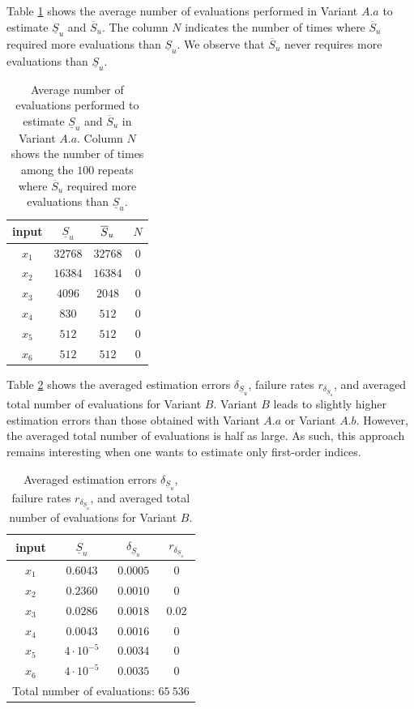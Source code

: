 Table \ref{comparison.gfunc} shows the average number of evaluations performed in Variant $A.a$ to estimate $\underline{S}_u$ and $\overline{S}_u$. The column $N$ indicates the number of times where $\overline{S}_u$ required more evaluations than $\underline{S}_u$. We observe that $\overline{S}_u$ never requires more evaluations than $\underline{S}_u$.
\begin{table}[t]
\caption{Average number of evaluations performed to estimate $\underline{S}_u$ and $\overline{S}_u$ in Variant $A.a$. Column $N$ shows the number of times among the $100$ repeats where $\overline{S}_u$ required more evaluations than $\underline{S}_u$.}
\centering
\begin{tabular}{cccc}
\hline
 input & $\underline{S}_u$ & $\ov{$S$}_u$ & $N$ \\ \hline
 $x_1$ & $32768$ & $32768$ & $0$ \\   \hline
 $x_2$ & $16384$ & $16384$ & $0$ \\  \hline
 $x_3$ & $4096$ & $2048$ & $0$ \\  \hline
 $x_4$ & $830$ & $512$ & $0$ \\  \hline
 $x_5$ & $512$ & $512$ & $0$ \\  \hline
 $x_6$ & $512$ & $512$ & $0$ \\  \hline
\end{tabular}
\label{comparison.gfunc}
\end{table}
\bigskip

Table \ref{res.gfunc.B} shows the averaged estimation errors $\delta_{\underline{S}_u}$, failure rates $r_{\delta_{\underline{S}_u}}$, and averaged total number of evaluations for Variant $B$. Variant $B$ leads to slightly higher estimation errors than those obtained with Variant $A.a$ or Variant $A.b$. However, the averaged total number of evaluations is half as large. As such, this approach remains interesting when one wants to estimate only first-order indices.
\begin{table}[t]
\caption{Averaged estimation errors $\delta_{\underline{S}_u}$, failure rates $r_{\delta_{\underline{S}_u}}$, and averaged total number of evaluations for Variant $B$.}
\centering
\begin{tabular}{cccc}
\hline
 input & $\underline{S}_u$ & $\delta_{\underline{S}_u}$ & $r_{\delta_{\underline{S}_u}}$ \\ \hline
 $x_1$ & $0.6043$ &  $0.0005$ & $0$ \\ \hline
 $x_2$ & $0.2360$ &  $0.0010$ & $0$ \\ \hline
 $x_3$ & $0.0286$ &  $0.0018$ & $0.02$ \\ \hline
 $x_4$ & $0.0043$ &  $0.0016$ & $0$    \\ \hline
 $x_5$ & $4\cdot 10^{-5}$ & $0.0034$ & $0$  \\ \hline
 $x_6$ & $4\cdot 10^{-5}$ & $0.0035$ & $0$  \\ \hline \hline
\multicolumn{4}{l}{Total number of evaluations: $65 \ 536$}\\ \hline 
\end{tabular}
\label{res.gfunc.B}
\end{table}

